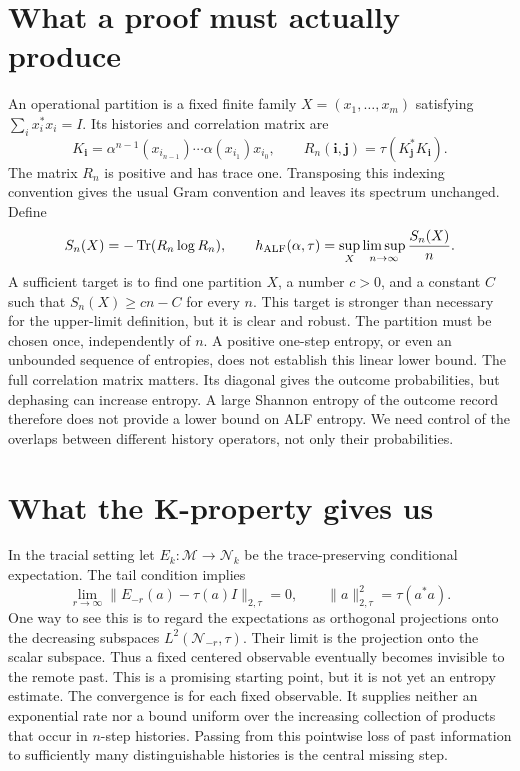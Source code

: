 \documentclass[11pt,a4paper]{article}
\newcommand{\Tr}{\operatorname{Tr}}
\begin{document}
\section{What a proof must actually produce}
An operational partition is a fixed finite family $X=(x_1,\ldots,x_m)$ satisfying $\sum_i x_i^*x_i=I$. Its histories and correlation matrix are
\[K_{\boldsymbol i}=\alpha^{n-1}(x_{i_{n-1}})\cdots\alpha(x_{i_1})x_{i_0},\qquad R_n(\boldsymbol i,\boldsymbol j)=\tau(K_{\boldsymbol j}^*K_{\boldsymbol i}).\]
The matrix $R_n$ is positive and has trace one. Transposing this indexing convention gives the usual Gram convention and leaves its spectrum unchanged. Define
\[S_n(X)=-\Tr(R_n\log R_n),\qquad h_{\rm ALF}(\alpha,\tau)=\sup_X\limsup_{n\to\infty}\frac{S_n(X)}n.\]
A sufficient target is to find one partition $X$, a number $c>0$, and a constant $C$ such that $S_n(X)\geq cn-C$ for every $n$. This target is stronger than necessary for the upper-limit definition, but it is clear and robust. The partition must be chosen once, independently of $n$. A positive one-step entropy, or even an unbounded sequence of entropies, does not establish this linear lower bound.
The full correlation matrix matters. Its diagonal gives the outcome probabilities, but dephasing can increase entropy. A large Shannon entropy of the outcome record therefore does not provide a lower bound on ALF entropy. We need control of the overlaps between different history operators, not only their probabilities.
\section{What the K-property gives us}
In the tracial setting let $E_k:\mathcal M\to\mathcal N_k$ be the trace-preserving conditional expectation. The tail condition implies
\[\lim_{r\to\infty}\|E_{-r}(a)-\tau(a)I\|_{2,\tau}=0,\qquad\|a\|_{2,\tau}^2=\tau(a^*a).\]
One way to see this is to regard the expectations as orthogonal projections onto the decreasing subspaces $L^2(\mathcal N_{-r},\tau)$. Their limit is the projection onto the scalar subspace. Thus a fixed centered observable eventually becomes invisible to the remote past.
This is a promising starting point, but it is not yet an entropy estimate. The convergence is for each fixed observable. It supplies neither an exponential rate nor a bound uniform over the increasing collection of products that occur in $n$-step histories. Passing from this pointwise loss of past information to sufficiently many distinguishable histories is the central missing step.
\end{document}
